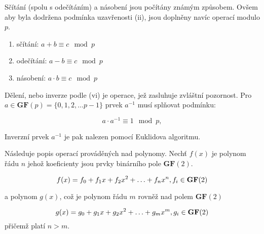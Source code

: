 Sčítání (spolu s odečítáním) a násobení jsou počítány známým způsobem. Ovšem aby byla dodržena podmínka uzavřenosti (ii), jsou doplněny navíc operací modulo $p$.

\begin{enumerate}[I]
\item sčítání: $a+b\equiv c \mod{p}$
\item odečítání: $a-b\equiv c \mod{p}$
\item násobení: $a\cdot b\equiv c \mod{p}$
\end{enumerate}

Dělení, nebo inverze podle (vi) je operace, jež zasluhuje zvláštní pozornost. Pro $a\in \mathbf{GF}(p) = \{ 0,1,2, \ldots p-1\}$ prvek $a^{-1}$ musí splňovat podmínku:

\begin{equation}
 a \cdot a^{-1} \equiv 1 \mod{p}, \label{eq_GF_inv}
\end{equation}

Inverzní prvek $a^{-1}$ je pak nalezen pomocí Euklidova algoritmu.



\vspace{0.35in}
\marginpar{\textcolor{txt_blue}{Aritmetika polynomů}}
Následuje popis operací prováděných nad polynomy.
Nechť $f(x)$ je polynom řádu $n$ jehož koeficienty jsou prvky binárního pole $\mathbf{GF}(2)$.

\begin{equation}
 f(x) =  f_0 + f_1 x + f_2 x^2 + \ldots + f_n x^n, \label{eq_polyf_def}
\\ f_i \in \mathbf{GF}(2)
\end{equation}

a polynom $g(x)$, což je polynom řádu $m$ rovněž nad polem $\mathbf{GF}(2)$

\begin{equation}
 g(x) =  g_0 + g_1 x + g_2 x^2 + \ldots + g_m x^m, \label{eq_polyg_def}
\\ g_i \in \mathbf{GF}(2)
\end{equation}
přičemž platí $n>m$.


